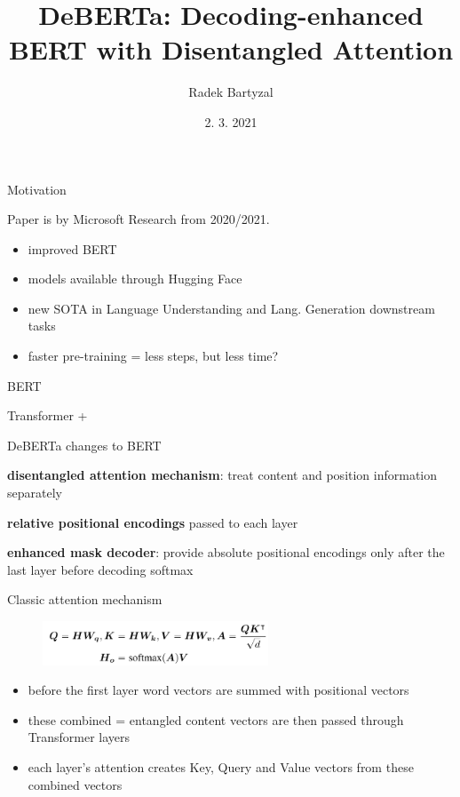 \documentclass{beamer}
\begin{document}
\title[DeBERTa]{DeBERTa: Decoding-enhanced BERT with Disentangled Attention}  
\author{Radek Bartyzal}
\date{2. 3. 2021} 

\frame{\titlepage} 

\begin{frame}{Motivation}

Paper is by Microsoft Research from 2020/2021.
\vfill

\begin{itemize}
\item improved BERT
\item models available through Hugging Face
\item new SOTA in Language Understanding and Lang. Generation downstream tasks
\item faster pre-training = less steps, but less time?
\end{itemize}


\end{frame}
\begin{frame}{BERT}

Transformer + 

\end{frame}
\begin{frame}{DeBERTa changes to BERT}


\textbf{disentangled attention mechanism}: treat content and position information separately

\vfill

\textbf{relative positional encodings} passed to each layer

\vfill

\textbf{enhanced mask decoder}: provide absolute positional encodings only after the last layer before decoding softmax

\end{frame}
\begin{frame}{Classic attention mechanism}


\begin{figure}[h]
\includegraphics[width=0.6\textwidth]{img/att}
\end{figure}

\begin{itemize}
\item before the first layer word vectors are summed with positional vectors
\item these combined = entangled content vectors are then passed through Transformer layers
\item each layer's attention creates Key, Query and Value vectors from these combined vectors
\end{itemize}

\end{frame}
\end{document}
